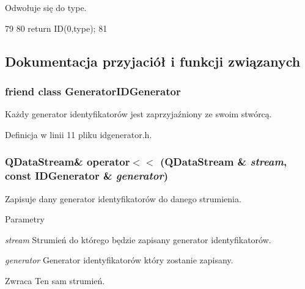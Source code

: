 Odwołuje się do type.




\begin{DoxyCode}
79     {
80         return ID(0,type);
81     }
\end{DoxyCode}




\subsection{Dokumentacja przyjaciół i funkcji związanych}
\hypertarget{classIDGenerator_ab840f4c248c2a91409f520e48e774cfb}{
\subsubsection[{GeneratorIDGenerator}]{\setlength{\rightskip}{0pt plus 5cm}friend class {\bf GeneratorIDGenerator}}}
\label{classIDGenerator_ab840f4c248c2a91409f520e48e774cfb}


Każdy generator identyfikatorów jest zaprzyjaźniony ze swoim stwórcą. 



Definicja w linii 11 pliku idgenerator.h.

\hypertarget{classIDGenerator_a244688be6d84ec73612ddd66ab376bd1}{
\subsubsection[{operator$<$$<$}]{\setlength{\rightskip}{0pt plus 5cm}QDataStream\& operator$<$$<$ (QDataStream \& {\em stream}, \/  const {\bf IDGenerator} \& {\em generator})}}
\label{classIDGenerator_a244688be6d84ec73612ddd66ab376bd1}


Zapisuje dany generator identyfikatorów do danego strumienia. 


\begin{DoxyParams}{Parametry}
\item[{\em stream}]Strumień do którego będzie zapisany generator identyfikatorów. \item[{\em generator}]Generator identyfikatorów który zostanie zapisany. \end{DoxyParams}
\begin{DoxyReturn}{Zwraca}
Ten sam strumień. 
\end{DoxyReturn}


